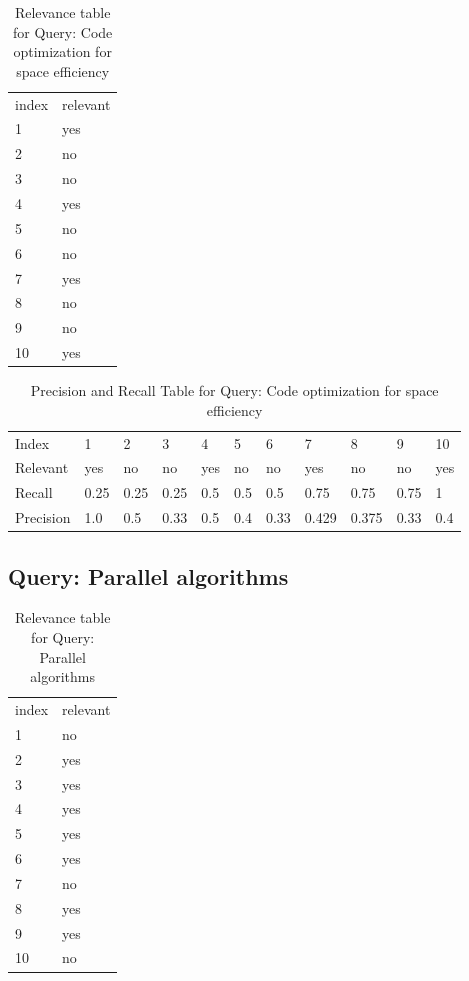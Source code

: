 \documentclass[12pt]{report}
\begin{document}
\begin{table}[]
\centering
\caption{Relevance table for Query: Code optimization for space efficiency}
\label{my-label}
\begin{tabular}{ll}
index & relevant \\
1     & yes      \\
2     & no       \\
3     & no       \\
4     & yes      \\
5     & no       \\
6     & no       \\
7     & yes      \\
8     & no       \\
9     & no       \\
10    & yes     
\end{tabular}
\end{table}


\begin{table}[]
\centering
\caption{Precision and Recall Table for Query:  Code optimization for space efficiency}
\label{my-label}
\begin{tabular}{lllllllllll}
Index     & 1    & 2    & 3    & 4   & 5   & 6    & 7     & 8     & 9    & 10  \\
Relevant  & yes  & no   & no   & yes & no  & no   & yes   & no    & no   & yes \\
Recall    & 0.25 & 0.25 & 0.25 & 0.5 & 0.5 & 0.5  & 0.75  & 0.75  & 0.75 & 1   \\
Precision & 1.0  & 0.5  & 0.33 & 0.5 & 0.4 & 0.33 & 0.429 & 0.375 & 0.33 & 0.4
\end{tabular}
\end{table}

\subsection{Query: Parallel algorithms}

\begin{table}[]
\centering
\caption{Relevance table for Query:  Parallel algorithms}
\label{my-label}
\begin{tabular}{ll}
index & relevant \\
1     & no       \\
2     & yes      \\
3     & yes      \\
4     & yes      \\
5     & yes      \\
6     & yes      \\
7     & no       \\
8     & yes      \\
9     & yes      \\
10    & no      
\end{tabular}
\end{table}
\end{document}
